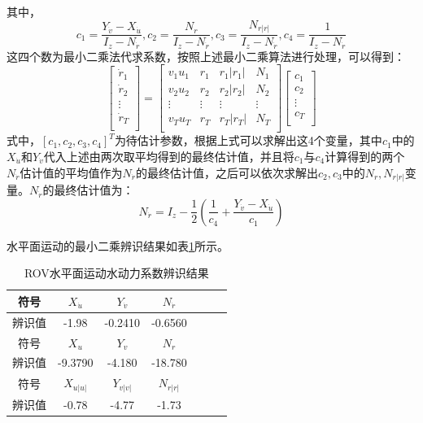 其中，
\begin{equation}
    c_1=\frac{Y_{\dot{v}}-X_{\dot{u}}}{I_z-N_{\dot{r}}},c_2=\frac{N_r}{I_z-N_{\dot{r}}}, c_3=\frac{N_{r|r|}}{I_z-N_{\dot{r}}},c_4=\frac{1}{I_z-N_{\dot{r}}}
\end{equation}
这四个数为最小二乘法代求系数，按照上述最小二乘算法进行处理，可以得到：
\begin{equation}
    \begin{bmatrix}
    \dot{r}_1 \\
    \dot{r}_2 \\
    \vdots \\
    \dot{r}_T \\
    \end{bmatrix}
    =
    \begin{bmatrix}
    v_1u_1 & r_1 & r_1|r_1| & N_1 \\
    v_2u_2 & r_2 & r_2|r_2| & N_2 \\
    \vdots & \vdots & \vdots & \vdots \\
    v_Tu_T & r_T & r_T|r_T| & N_T \\
    \end{bmatrix}
    \begin{bmatrix}
    c_1 \\
    c_2 \\
    \vdots \\
    c_T \\
    \end{bmatrix}
\end{equation}
式中，$[c_1,c_2,c_3,c_4]^T$为待估计参数，根据上式可以求解出这4个变量，其中$c_1$中的$X_{\dot{u}}$和$Y_{\dot{v}}$代入上述由两次取平均得到的最终估计值，并且将$c_1$与$c_4$计算得到的两个$N_{\dot{r}}$估计值的平均值作为$N_{\dot{r}}$的最终估计值，之后可以依次求解出$c_2,c_3$中的$N_r,N_{r|r|}$变量。$N_{\dot{r}}$的最终估计值为：
\begin{equation}
    N_{\dot{r}} = I_z - \frac{1}{2}(\frac{1}{c_4} + \frac{Y_{\dot{v}}-X_{\dot{u}}}{c_1})
\end{equation}

水平面运动的最小二乘辨识结果如表\ref{t._hydro_coff_ident_horizon}所示。

\begin{table}[htb]
  \centering
  \caption{ROV水平面运动水动力系数辨识结果}
  \label{t._hydro_coff_ident_horizon}
  \begin{tabular}{ccccccc}
  \hline
符号 & $X_{\dot{u}}$ & $Y_{\dot{v}}$ & $N_{\dot{r}}$ \\
\hline
辨识值  & -1.98          & -0.2410          & -0.6560         \\
\hline
\hline
符号 & $X_u$         & $Y_v$            & $N_r$         \\
\hline
辨识值  & -9.3790         & -4.180            & -18.780         \\
\hline
\hline
符号 & $X_{u|u|}$    & $Y_{v|v|}$     & $N_{r|r|}$    \\
\hline
辨识值  & -0.78        & -4.77            & -1.73 \\  
\hline
\end{tabular}
\end{table}


